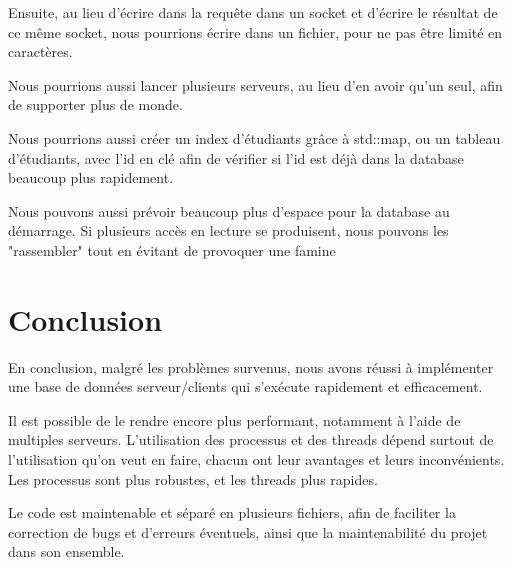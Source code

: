 \documentclass[utf8]{article}
\begin{document}
\begin{large}
Ensuite, au lieu d'écrire dans la requête dans un socket et d'écrire le résultat
de ce même socket, nous pourrions écrire dans un fichier, pour ne pas être
limité en caractères.

Nous pourrions aussi lancer plusieurs serveurs, au lieu d'en avoir qu'un seul,
afin de supporter plus de monde.

Nous pourrions aussi créer un index d'étudiants grâce à std::map, ou un tableau
d'étudiants, avec l'id en clé afin de vérifier si l'id est déjà dans la database
beaucoup plus rapidement.

Nous pouvons aussi prévoir beaucoup plus d'espace pour la database au démarrage.
Si plusieurs accès en lecture se produisent, nous pouvons les "rassembler" tout
en évitant de provoquer une famine
\section{Conclusion}
\par
\indent
En conclusion, malgré les problèmes survenus, nous avons réussi à implémenter
une base de données serveur/clients qui s'exécute rapidement et
efficacement.
\par 
Il est possible de le rendre encore plus performant, notamment
à l'aide de multiples serveurs. L'utilisation des processus et des threads
dépend surtout de l'utilisation qu'on veut en faire, chacun ont leur avantages
et leurs inconvénients. Les processus sont plus robustes, et les threads plus rapides.

Le code est maintenable et séparé en plusieurs fichiers,
afin de faciliter la correction de bugs et d'erreurs éventuels, ainsi que la
maintenabilité du projet dans son ensemble.
\par

\end{large}
\end{document}

